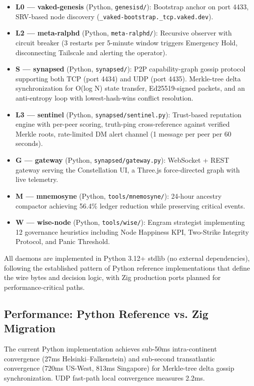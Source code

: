 \documentclass[conference]{IEEEtran}
\begin{document}
\begin{itemize}
\item \textbf{L0 --- vaked-genesis} (Python, \texttt{genesisd/}): Bootstrap
anchor on port 4433, SRV-based node discovery (\texttt{\_vaked-bootstrap.\_tcp.vaked.dev}).
\item \textbf{L2 --- meta-ralphd} (Python, \texttt{meta-ralphd/}): Recursive
observer with circuit breaker (3 restarts per 5-minute window triggers
Emergency Hold, disconnecting Tailscale and alerting the operator).
\item \textbf{S --- synapsed} (Python, \texttt{synapsed/}): P2P capability-graph
gossip protocol supporting both TCP (port 4434) and UDP (port 4435).
Merkle-tree delta synchronization for O(log N) state transfer, Ed25519-signed
packets, and an anti-entropy loop with lowest-hash-wins conflict resolution.
\item \textbf{L3 --- sentinel} (Python, \texttt{synapsed/sentinel.py}):
Trust-based reputation engine with per-peer scoring, truth-ping
cross-reference against verified Merkle roots, rate-limited DM alert
channel (1 message per peer per 60 seconds).
\item \textbf{G --- gateway} (Python, \texttt{synapsed/gateway.py}):
WebSocket + REST gateway serving the Constellation UI, a Three.js
force-directed graph with live telemetry.
\item \textbf{M --- mnemosyne} (Python, \texttt{tools/mnemosyne/}):
24-hour ancestry compactor achieving 56.4\% ledger reduction while
preserving critical events.
\item \textbf{W --- wise-node} (Python, \texttt{tools/wise/}):
Engram strategist implementing 12 governance heuristics including
Node Happiness KPI, Two-Strike Integrity Protocol, and Panic Threshold.
\end{itemize}

All daemons are implemented in Python 3.12+ stdlib (no external dependencies),
following the established pattern of Python reference implementations that
define the wire bytes and decision logic, with Zig production ports planned
for performance-critical paths.

\subsection{Performance: Python Reference vs. Zig Migration}

The current Python implementation achieves sub-50ms intra-continent convergence
(27ms Helsinki--Falkenstein) and sub-second transatlantic convergence (720ms
US-West, 813ms Singapore) for Merkle-tree delta gossip synchronization. UDP
fast-path local convergence measures 2.2ms.
\end{document}

